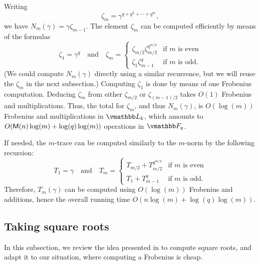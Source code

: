 Writing
$$\zeta_m = \gamma^{q + q^2 + \cdots + q^m},$$ we have $N_m(\gamma) = \gamma\zeta_{m
  - 1}$. The element $\zeta_m$ can be computed efficiently by means
of the formulas
\begin{equation}
\label{eq:zeta}
\zeta_1 = \gamma^q \quad\text{and}\quad
\zeta_m = 
\begin{cases}
\zeta_{m / 2}\zeta_{m / 2}^{q^{m / 2}} & \text{if $m$ is even}  \\
\zeta_1\zeta_{m - 1}^{q} & \text{if $m$ is odd.}
\end{cases} 
\end{equation}
(We could compute $N_m(\gamma)$ directly using a similar recurrence,
but we will reuse the $\zeta_m$ in the next subsection.)  Computing
$\zeta_1$ is done by means of one Frobenius computation.  Deducing
$\zeta_m$ from either $\zeta_{m / 2}$ or $\zeta_{(m-1) / 2}$ takes
$O(1)$ Frobenius and multiplications. Thus, the total for $\zeta_m$,
and thus $N_m(\gamma)$, is $O(\log(m))$ Frobenius and multiplications
in $\L_k$, which amounts to $O(\mathsf{M}(n)\log(m)+\log(q)\log(m))$
operations in $\F_q$.

If needed, the $m$-trace can be computed similarly to the $m$-norm by
the following recursion:
$$T_1 = \gamma \quad\text{and}\quad
T_m = 
\begin{cases}
T_{m / 2} + T_{m / 2}^{q^{m / 2}} & \text{if $m$ is even}  \\
T_1 + T_{m - 1}^{q} & \text{if $m$ is odd.}
\end{cases}
$$ Therefore, $T_m(\gamma)$ can be computed using $O(\log(m))$
Frobenius and additions, hence the overall running time
$O(n\log(m)+\log(q)\log(m))$.



\subsection{Taking square roots}\label{section:sqrt}

In this subsection, we review the idea presented in \cite{DlsSch2011}
to compute square roots, and adapt it to our situation, where
computing a Frobenius is cheap.


